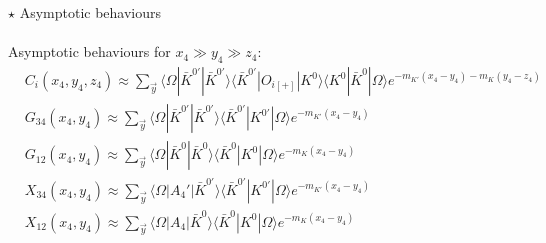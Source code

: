 \documentclass{beamer}
\newcommand{\la}{\langle}
\newcommand{\ra}{\rangle}
\begin{document}
\begin{frame}[noframenumbering]{$\star$ Asymptotic behaviours}
      \framesubtitle{\hspace*{1pt}}
      Asymptotic behaviours for $x_4 \gg y_4 \gg z_4$:
      \begin{equation*}
            \begin{split}
                  & C_i (x_4,y_4,z_4) \approx \sum_{\vec{y}} \la \Omega | \bar K^{0'} | \bar K^{0'} \ra \la \bar K^{0'} | O_{i[+]} | K^{0} \ra \la K^{0} | \bar K^{0} | \Omega \ra e^{-m_{K'} (x_4-y_4)-m_K (y_4-z_4)}\\
                  & G_{34} (x_4,y_4)  \approx \sum_{\vec{y}} \la \Omega | \bar K^{0'} | \bar K^{0'} \ra \la \bar K^{0'} | K^{0'}                    | \Omega \ra e^{-m_{K'} (x_4-y_4)} \\
                  & G_{12} (x_4,y_4)  \approx \sum_{\vec{y}} \la \Omega | \bar K^{0}  | \bar K^{0}  \ra \la \bar K^{0}  | K^{0}                     | \Omega \ra e^{-m_K (x_4-y_4)}    \\
                  & X_{34} (x_4,y_4)  \approx \sum_{\vec{y}} \la \Omega |      A_{4}' | \bar K^{0'} \ra \la \bar K^{0'} | K^{0'}                    | \Omega \ra e^{-m_{K'} (x_4-y_4)} \\
                  & X_{12} (x_4,y_4)  \approx \sum_{\vec{y}} \la \Omega |      A_{4}  | \bar K^{0}  \ra \la \bar K^{0}  | K^{0}                     | \Omega \ra e^{-m_K (x_4-y_4)}    \\                  
            \end{split}
      \end{equation*}
\end{frame}
\end{document}
